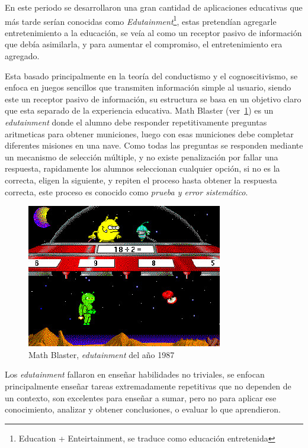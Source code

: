En este periodo se desarrollaron una gran cantidad de aplicaciones educativas
que más tarde serían conocidas como \emph{Edutainment}\footnote{Education +
	Enteirtainment, se traduce como educación entretenida}, estas pretendían
agregarle entretenimiento a la educación, se veía al como un receptor pasivo de
información que debía asimilarla, y para aumentar el compromiso, el
entretenimiento era agregado\cite{resnick:2004}.

Esta basado principalmente en la teoría del conductismo y el cognoscitivismo, se
enfoca en juegos sencillos que transmiten información simple al usuario, siendo
este un receptor pasivo de información, su estructura se basa en un objetivo
claro que esta separado de la experiencia educativa\cite{egenfeldt2007third}.
Math Blaster (ver~\ref{fig:math_blaster}) es un \emph{edutainment} donde el
alumno debe responder repetitivamente preguntas aritmeticas para obtener
municiones, luego con esas municiones debe completar diferentes misiones en una
nave\cite{bruckman1999can}. Como todas las preguntas se responden mediante un
mecanismo de selección múltiple, y no existe penalización por fallar una
respuesta, rapidamente los alumnos seleccionan cualquier opción, si no es la
correcta, eligen la siguiente, y repiten el proceso hasta obtener la respuesta
correcta, este proceso es conocido como \emph{prueba y error sistemático}. 

\begin{figure}[h!] \centering \includegraphics[scale=0.5]{tics/math_blaster.jpg}
	\caption{Math Blaster, \emph{edutainment} del año 1987}
	\label{fig:math_blaster} \end{figure}

Los \emph{edutainment} fallaron en enseñar habilidades no triviales, se enfocan
principalmente enseñar tareas extremadamente repetitivas que no dependen de un
contexto\cite{charsky:2010}\cite{egenfeldt2007third}\cite{bruckman1999can}, son
excelentes para enseñar a sumar, pero no para aplicar ese conocimiento, analizar
y obtener conclusiones, o evaluar lo que aprendieron.

